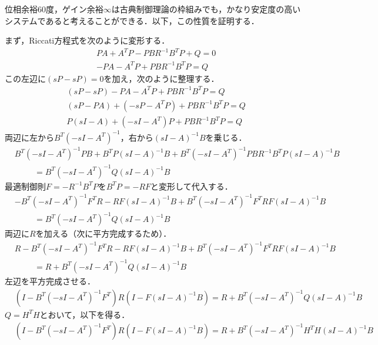 位相余裕60度，ゲイン余裕$\infty$は古典制御理論の枠組みでも，かなり安定度の高いシステムであると考えることができる．以下，この性質を証明する．

まず，Riccati方程式を次のように変形する．
\begin{align}
	&
	P A + A^T P - P B R^{-1} B^T P + Q = 0
\nonumber \\
	&
	- P A -  A^T P + P B R^{-1} B^T P = Q 
\nonumber
\end{align}
この左辺に$(sP - sP)=0$を加え，次のように整理する．
\begin{align}
	&
	(sP - sP) - P A -  A^T P + P B R^{-1} B^T P = Q 
\nonumber \\
	&
	(sP - P A) + (-sP-  A^T P) + P B R^{-1} B^T P = Q 
\nonumber \\
	&
	P(sI - A) + (-sI - A^T) P + P B R^{-1} B^T P = Q  
\nonumber
\end{align}
両辺に左から$B^T (-sI - A^T)^{-1}$，右から$(sI - A)^{-1} B$を乗じる．
\begin{align}
	&
	B^T (-sI - A^T)^{-1} P B + B^T P (sI - A)^{-1} B + B^T (-sI - A^T)^{-1}P B R^{-1} B^T P(sI - A)^{-1} B
\nonumber \\
	&\hspace{1cm}
		= B^T (-sI - A^T)^{-1}Q (sI - A)^{-1} B
\nonumber
\end{align}
最適制御則$F=-R^{-1} B^T P$を$B^T P = -R F$と変形して代入する．
\begin{align}
	&
	- B^T (-sI - A^T)^{-1} F^T R - R F (sI - A)^{-1} B + B^T (-sI - A^T)^{-1}F^T R F(sI - A)^{-1} B
\nonumber \\
	&\hspace{1cm}
		= B^T (-sI - A^T)^{-1}Q (sI - A)^{-1} B
\nonumber
\end{align}
両辺に$R$を加える（次に平方完成するため）．
\begin{align}
	&
	R - B^T (-sI - A^T)^{-1} F^T R - R F (sI - A)^{-1} B + B^T (-sI - A^T)^{-1}F^T R F(sI - A)^{-1} B
\nonumber \\
	&\hspace{1cm}
		= R + B^T (-sI - A^T)^{-1}Q (sI - A)^{-1} B
\nonumber
\end{align}
左辺を平方完成させる．
\begin{align}
	&
	(I- B^T (-sI - A^T)^{-1}F^T) R (I - F (sI - A)^{-1} B)
		= R + B^T (-sI - A^T)^{-1}Q (sI - A)^{-1} B
\nonumber
\end{align}
$Q = H^T H$とおいて，以下を得る．
\begin{align}
	&
	(I- B^T (-sI - A^T)^{-1}F^T) R (I - F (sI - A)^{-1} B)
		= R + B^T (-sI - A^T)^{-1}H^T H (sI - A)^{-1} B
\label{kalman_eq}
\end{align}

